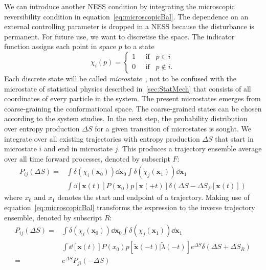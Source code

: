 We can introduce another NESS condition by integrating the microscopic reversibility condition in equation~\ref{eq:microscopicBal}. The dependence on an external controlling parameter is dropped in a NESS because the disturbance is permanent. For future use, we want to discretise the space. The indicator function assigns each point in space $p$ to a state
  \begin{equation}
    \chi_i (p) =  \begin{cases}
      1\;\;\;\;\; \text{if}\;\;\; p \in i\\
      0\;\;\;\;\; \text{if}\;\;\; p \notin i.
    \end{cases}
  \end{equation}
Each discrete state will be called \textit{microstate}~\cite{bowman2013introduction}, not to be confused with the microstate of statistical physics described in~\ref{sec:StatMech} that consists of all coordinates of every particle in the system. The present microstates emerges from coarse-graining the conformational space. The coarse-grained states can be chosen according to the system studies. In the next step, the probability distribution over entropy production $\Delta S$ for a given transition of microstates is sought. We integrate over all existing trajectories with entropy production $\Delta S $ that start in microstate $i$ and end in microstate $j$. This produces a trajectory ensemble average over all time forward processes, denoted by subscript $F$:
  \begin{equation}
    \begin{aligned}
      P_{ij} ( \Delta S ) 
      =& \int \delta (\chi_i (\mathbf{x}_0)) \dd {\mathbf{x}_0} \int \delta 
(\chi_j (\mathbf{x}_1)) \dd{\mathbf{x}_1} \\ 
      & \int \dd{[\mathbf{x}(t)]}  P (\mathbf{x}_0) p[\mathbf{x}(+t)]  
\delta(\Delta S - \Delta S_F[\mathbf{x}(t)])
    \end{aligned}
  \end{equation}
  where $x_0$ and $x_1$ denotes the start and endpoint of a 
trajectory. Making use of equation~\ref{eq:microscopicBal} transforms the expression to the inverse trajectory ensemble, denoted by subscript $R$:
  \begin{equation}
    \begin{aligned}
      P_{ij} ( \Delta S ) 
      =& \int \delta (\chi_i (\mathbf{x}_0)) \dd{\mathbf{x}_0} \int \delta 
(\chi_j (\mathbf{x}_1)) \dd{\mathbf{x}_1} \\ &  \int \dd{[\mathbf{x}(t)]}   
      P (x_0) p[\mathbf{ \tilde x} (-t)| \tilde \lambda(-t)] e^{\Delta S} 
\delta(\Delta S +  
\Delta S_R ) 
      \\ =& e^{\Delta S} P_{ji}(- \Delta S)  
    \end{aligned}
    \label{eq:DeltaS}
  \end{equation}
